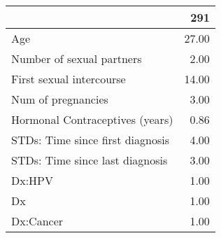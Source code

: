 \begin{tabular}{lr}
\toprule
{} &    291 \\
\midrule
Age                              &  27.00 \\
Number of sexual partners        &   2.00 \\
First sexual intercourse         &  14.00 \\
Num of pregnancies               &   3.00 \\
Hormonal Contraceptives (years)  &   0.86 \\
STDs: Time since first diagnosis &   4.00 \\
STDs: Time since last diagnosis  &   3.00 \\
Dx:HPV                           &   1.00 \\
Dx                               &   1.00 \\
Dx:Cancer                        &   1.00 \\
\bottomrule
\end{tabular}
